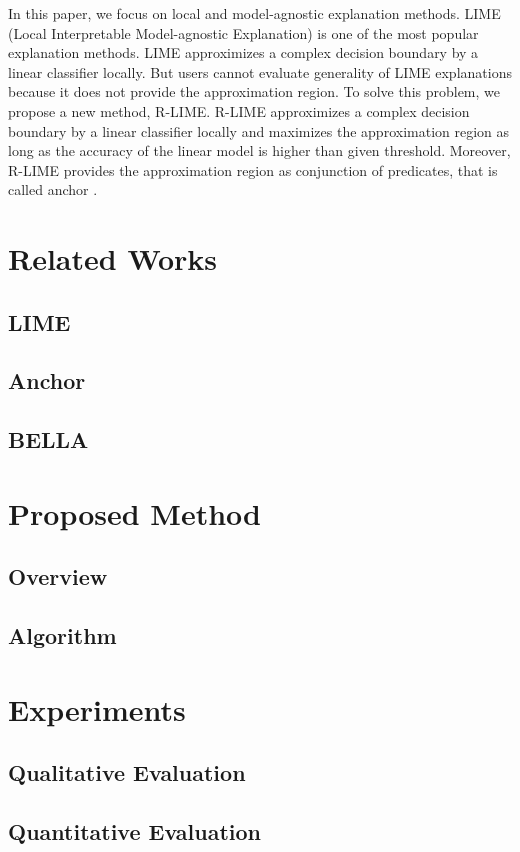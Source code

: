 \documentclass[runningheads]{llncs}
\begin{document}
In this paper, we focus on local and model-agnostic explanation methods.
LIME (Local Interpretable Model-agnostic Explanation) \cite{ribeiro2016why} is one of the most popular explanation methods.
LIME approximizes a complex decision boundary by a linear classifier locally.
But users cannot evaluate generality of LIME explanations because it does not provide the approximation region.
To solve this problem, we propose a new method, R-LIME.
R-LIME approximizes a complex decision boundary by a linear classifier locally and maximizes the approximation region as long as the accuracy of the linear model is higher than given threshold.
Moreover, R-LIME provides the approximation region as conjunction of predicates, that is called anchor \cite{ribeiro2018anchors}.
\section{Related Works}
\subsection{LIME}
\subsection{Anchor}
\subsection{BELLA}
\section{Proposed Method}
\subsection{Overview}
\subsection{Algorithm}
\section{Experiments}
\subsection{Qualitative Evaluation}
\subsection{Quantitative Evaluation}
\end{document}
